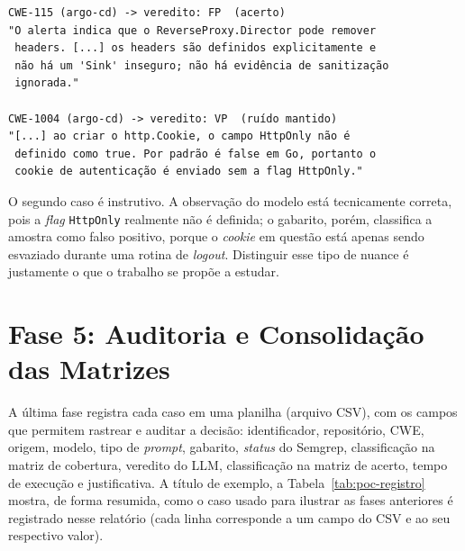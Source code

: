 \begin{verbatim}
CWE-115 (argo-cd) -> veredito: FP  (acerto)
"O alerta indica que o ReverseProxy.Director pode remover
 headers. [...] os headers são definidos explicitamente e
 não há um 'Sink' inseguro; não há evidência de sanitização
 ignorada."

CWE-1004 (argo-cd) -> veredito: VP  (ruído mantido)
"[...] ao criar o http.Cookie, o campo HttpOnly não é
 definido como true. Por padrão é false em Go, portanto o
 cookie de autenticação é enviado sem a flag HttpOnly."
\end{verbatim}

O segundo caso é instrutivo. A observação do modelo está tecnicamente correta, pois a \textit{flag} \texttt{HttpOnly} realmente não é definida; o gabarito, porém, classifica a amostra como falso positivo, porque o \textit{cookie} em questão está apenas sendo esvaziado durante uma rotina de \textit{logout}. Distinguir esse tipo de nuance é justamente o que o trabalho se propõe a estudar.

\section{Fase 5: Auditoria e Consolidação das Matrizes}

A última fase registra cada caso em uma planilha (arquivo CSV), com os campos que permitem rastrear e auditar a decisão: identificador, repositório, CWE, origem, modelo, tipo de \textit{prompt}, gabarito, \textit{status} do Semgrep, classificação na matriz de cobertura, veredito do LLM, classificação na matriz de acerto, tempo de execução e justificativa. A título de exemplo, a Tabela~\ref{tab:poc-registro} mostra, de forma resumida, como o
caso usado para ilustrar as fases anteriores é registrado nesse relatório (cada linha
corresponde a um campo do CSV e ao seu respectivo valor).

